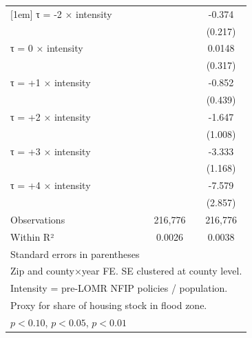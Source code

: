 \begin{table}[htbp]
\begin{tabular}{l*{2}{c}}
[1em]
τ = -2 × intensity  &                     &      -0.374\sym{*}  \\
                    &                     &     (0.217)         \\
[1em]
τ = 0 × intensity   &                     &      0.0148         \\
                    &                     &     (0.317)         \\
[1em]
τ = +1 × intensity  &                     &      -0.852\sym{*}  \\
                    &                     &     (0.439)         \\
[1em]
τ = +2 × intensity  &                     &      -1.647         \\
                    &                     &     (1.008)         \\
[1em]
τ = +3 × intensity  &                     &      -3.333\sym{***}\\
                    &                     &     (1.168)         \\
[1em]
τ = +4 × intensity  &                     &      -7.579\sym{***}\\
                    &                     &     (2.857)         \\
\hline
Observations        &     216,776         &     216,776         \\
Within R²           &      0.0026         &      0.0038         \\
\hline\hline
\multicolumn{3}{l}{\footnotesize Standard errors in parentheses}\\
\multicolumn{3}{l}{\footnotesize Zip and county×year FE. SE clustered at county level.}\\
\multicolumn{3}{l}{\footnotesize Intensity = pre-LOMR NFIP policies / population.}\\
\multicolumn{3}{l}{\footnotesize Proxy for share of housing stock in flood zone.}\\
\multicolumn{3}{l}{\footnotesize \sym{*} \(p<0.10\), \sym{**} \(p<0.05\), \sym{***} \(p<0.01\)}\\
\end{tabular}
\end{table}

